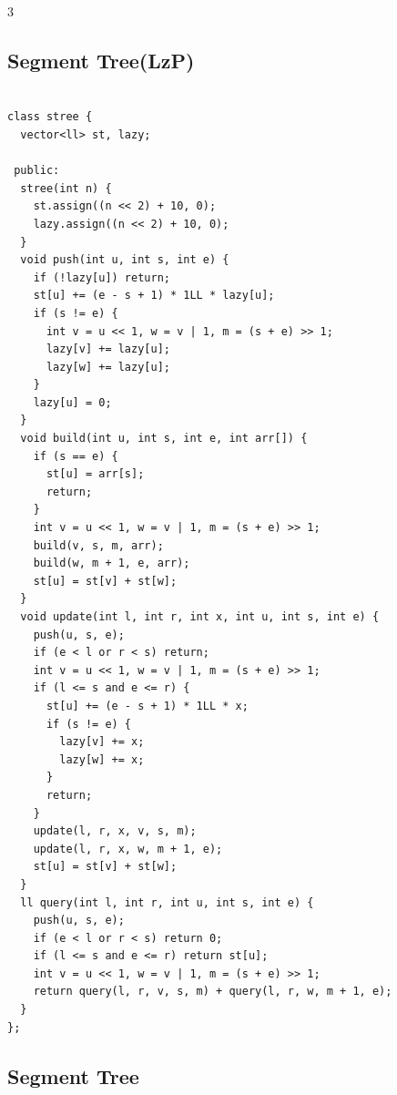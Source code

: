 \documentclass[10pt, landscape, a4paper, onesided]{extarticle}
\begin{document}
\begin{multicols*}{3}
\subsection{Segment Tree(LzP)}
\begin{verbatim}

class stree {
  vector<ll> st, lazy;

 public:
  stree(int n) {
    st.assign((n << 2) + 10, 0);
    lazy.assign((n << 2) + 10, 0);
  }
  void push(int u, int s, int e) {
    if (!lazy[u]) return;
    st[u] += (e - s + 1) * 1LL * lazy[u];
    if (s != e) {
      int v = u << 1, w = v | 1, m = (s + e) >> 1;
      lazy[v] += lazy[u];
      lazy[w] += lazy[u];
    }
    lazy[u] = 0;
  }
  void build(int u, int s, int e, int arr[]) {
    if (s == e) {
      st[u] = arr[s];
      return;
    }
    int v = u << 1, w = v | 1, m = (s + e) >> 1;
    build(v, s, m, arr);
    build(w, m + 1, e, arr);
    st[u] = st[v] + st[w];
  }
  void update(int l, int r, int x, int u, int s, int e) {
    push(u, s, e);
    if (e < l or r < s) return;
    int v = u << 1, w = v | 1, m = (s + e) >> 1;
    if (l <= s and e <= r) {
      st[u] += (e - s + 1) * 1LL * x;
      if (s != e) {
        lazy[v] += x;
        lazy[w] += x;
      }
      return;
    }
    update(l, r, x, v, s, m);
    update(l, r, x, w, m + 1, e);
    st[u] = st[v] + st[w];
  }
  ll query(int l, int r, int u, int s, int e) {
    push(u, s, e);
    if (e < l or r < s) return 0;
    if (l <= s and e <= r) return st[u];
    int v = u << 1, w = v | 1, m = (s + e) >> 1;
    return query(l, r, v, s, m) + query(l, r, w, m + 1, e);
  }
};
\end{verbatim}

\subsection{Segment Tree}
\begin{verbatim}


\end{verbatim}
\end{multicols*}
\end{document}

